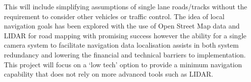 \documentclass[]{aiaa-tc}%
\begin{document}
This will include simplifying assumptions of single lane roads/tracks without the requirement to consider other vehicles or traffic control. The idea of local navigation goals has been explored with the use of Open Street Map data and LIDAR for road mapping with promising success \citep{mitLocalNavDriving} however the ability for a single camera system to facilitate navigation data localisation assists in both system redundancy and lowering the financial and technical barriers to implementation. This project will focus on a `low tech' option to provide a minimum navigation capability that does not rely on more advanced tools such as LIDAR. 
% 
%
%
\end{document}
